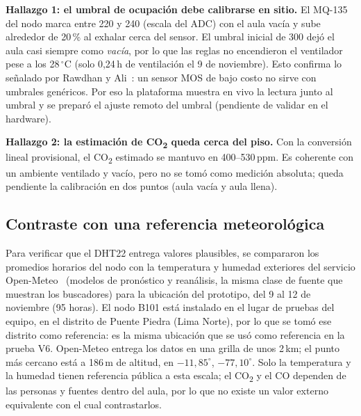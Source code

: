 \documentclass[10pt,a4paper]{article}
\newcommand{\COd}{CO\textsubscript{2}}
\begin{document}
\textbf{Hallazgo 1: el umbral de ocupación debe calibrarse en sitio.} El MQ-135 del nodo marca entre 220 y 240 (escala del ADC) con el aula vacía y sube alrededor de 20\,\% al exhalar cerca del sensor. El umbral inicial de 300 dejó el aula casi siempre como \emph{vacía}, por lo que las reglas no encendieron el ventilador pese a los 28\,$^\circ$C (solo 0,24\,h de ventilación el 9 de noviembre). Esto confirma lo señalado por Rawdhan y Ali~\cite{rawdhan}: un sensor MOS de bajo costo no sirve con umbrales genéricos. Por eso la plataforma muestra en vivo la lectura junto al umbral y se preparó el ajuste remoto del umbral (pendiente de validar en el hardware).

\textbf{Hallazgo 2: la estimación de \COd{} queda cerca del piso.} Con la conversión lineal provisional, el \COd{} estimado se mantuvo en 400--530\,ppm. Es coherente con un ambiente ventilado y vacío, pero no se tomó como medición absoluta; queda pendiente la calibración en dos puntos (aula vacía y aula llena).

\subsection{Contraste con una referencia meteorológica}
Para verificar que el DHT22 entrega valores plausibles, se compararon los promedios horarios del nodo con la temperatura y humedad exteriores del servicio Open-Meteo~\cite{openmeteo} (modelos de pronóstico y reanálisis, la misma clase de fuente que muestran los buscadores) para la ubicación del prototipo, del 9 al 12 de noviembre (95 horas). El nodo B101 está instalado en el lugar de pruebas del equipo, en el distrito de Puente Piedra (Lima Norte), por lo que se tomó ese distrito como referencia: es la misma ubicación que se usó como referencia en la prueba V6. Open-Meteo entrega los datos en una grilla de unos 2\,km; el punto más cercano está a 186\,m de altitud, en $-11{,}85^\circ$, $-77{,}10^\circ$. Solo la temperatura y la humedad tienen referencia pública a esta escala; el \COd{} y el CO dependen de las personas y fuentes dentro del aula, por lo que no existe un valor externo equivalente con el cual contrastarlos.
\end{document}
